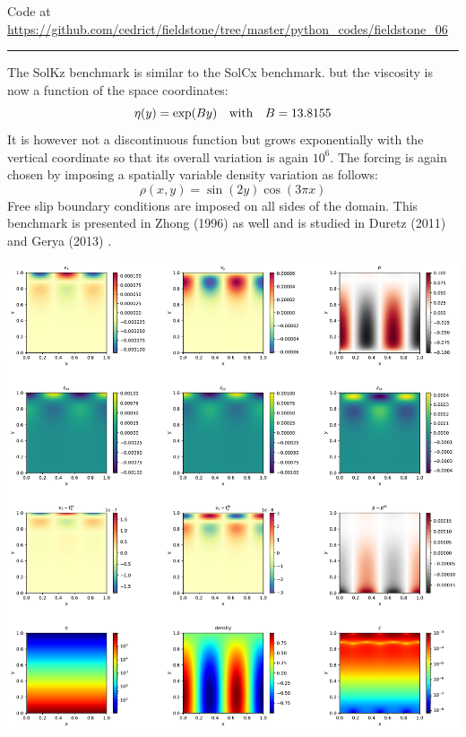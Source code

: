 

\begin{center}
Code at \url{https://github.com/cedrict/fieldstone/tree/master/python_codes/fieldstone_06}
\end{center}

\par\noindent\rule{\textwidth}{0.4pt}

The SolKz benchmark \cite{repa87} is similar to the SolCx benchmark.
but the viscosity is now a function of the space coordinates: 
\begin{equation}
\eta(y)=\exp(By) \quad {\rm with} \quad B=13.8155
\end{equation}
It is however not a discontinuous function but grows exponentially with the vertical coordinate so that its overall variation is again $10^6$. 
The forcing is again chosen by imposing a spatially variable density variation as follows:
\begin{equation}
\rho(x,y)=\sin(2y) \cos(3\pi x)
\end{equation}
Free slip boundary conditions are imposed on all sides of the domain.
This benchmark is presented in Zhong (1996) \cite{zhon96} as well and is studied 
in Duretz \etal (2011) \cite{dumg11} and Gerya \etal (2013) \cite{gemd13}.

\begin{center}
\includegraphics[width=14cm]{python_codes/fieldstone_06/results/solution.pdf}
\end{center}

